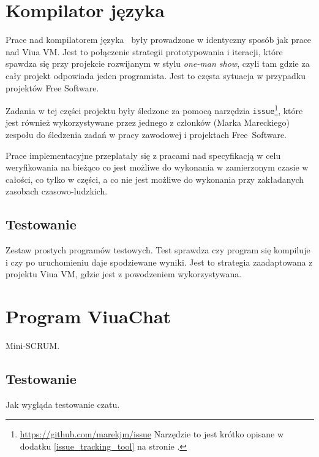 \section{Kompilator języka \ViuAct}

Prace nad kompilatorem języka \ViuAct\ były prowadzone w identyczny sposób jak
prace nad Viua VM. Jest to połączenie strategii prototypowania i iteracji, które
spawdza się przy projekcie rozwijanym w stylu \emph{one-man show}, czyli tam
gdzie za cały projekt odpowiada jeden programista. Jest to częsta sytuacja w
przypadku projektów Free Software.

Zadania w tej części projektu były śledzone za pomocą narzędzia
\texttt{issue}\footnote{\url{https://github.com/marekjm/issue} Narzędzie to jest
krótko opisane w dodatku \ref{issue_tracking_tool} na stronie
\pageref{issue_tracking_tool}.}, które jest również wykorzystywane przez jednego
z członków (Marka Mareckiego) zespołu do śledzenia zadań w pracy zawodowej i
projektach Free~Software.

Prace implementacyjne przeplatały się z pracami nad specyfikacją w celu
weryfikowania na bieżąco co jest możliwe do wykonania w zamierzonym czasie w
całości, co tylko w części, a co nie jest możliwe do wykonania przy zakładanych
zasobach czasowo-ludzkich.

\subsection{Testowanie}

Zestaw prostych programów testowych. Test sprawdza czy program się kompiluje i czy po uruchomieniu daje
spodziewane wyniki. Jest to strategia zaadaptowana z projektu Viua VM, gdzie jest z powodzeniem
wykorzystywana.

\section{Program ViuaChat}

Mini-SCRUM.

\subsection{Testowanie}

Jak wygląda testowanie czatu.
